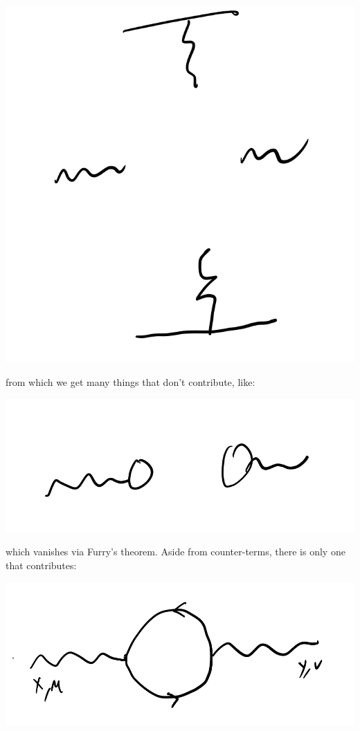 \begin{center}
    \includegraphics[scale=0.5]{Images/fig-lec31p6.png}
\end{center}

from which we get many things that don't contribute, like:

\begin{center}
    \includegraphics[scale=0.5]{Images/fig-lec31p7.png}
\end{center}

which vanishes via Furry's theorem. Aside from counter-terms, there is only one that contributes:

\begin{center}
    \includegraphics[scale=0.5]{Images/fig-lec31p8.png}
\end{center}

